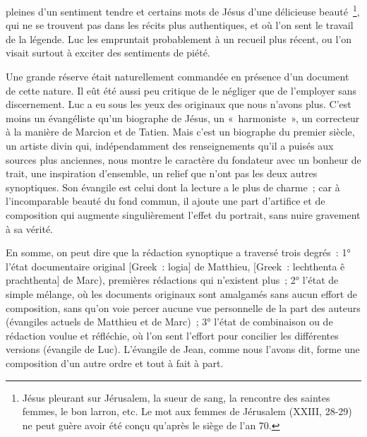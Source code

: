 \documentclass[french,twoside]{book} %
\begin{document}
pleines d’un sentiment tendre et certains mots de Jésus d’une délicieuse beauté \footnote{Jésus pleurant sur Jérusalem, la sueur de sang, la rencontre des saintes femmes, le bon larron, etc. Le mot aux femmes de Jérusalem (XXIII, 28-29) ne peut guère avoir été conçu qu’après le siège de l’an 70.}, qui ne se trouvent pas dans les récits plus authentiques, et où l’on sent le travail de la légende. Luc les empruntait probablement à un recueil plus récent, ou l’on visait surtout à exciter des sentiments de piété.\par
Une grande réserve était naturellement commandée en présence d’un document de cette nature. Il eût été aussi peu critique de le négliger que de l’employer sans discernement. Luc a eu sous les yeux des originaux que nous n’avons plus. C’est moins un évangéliste qu’un biographe de Jésus, un « harmoniste », un correcteur à la manière de Marcion et de Tatien. Mais c’est un biographe du premier siècle, un artiste divin qui, indépendamment des renseignements qu’il a puisés aux sources plus anciennes, nous montre le caractère du fondateur avec un bonheur de trait, une inspiration d’ensemble, un relief que n’ont pas les deux autres synoptiques. Son évangile est celui dont la lecture a le plus de charme ; car à l’incomparable beauté du fond commun, il ajoute une part d’artifice et de composition qui augmente singulièrement l’effet du portrait, sans nuire gravement à sa vérité.\par
En somme, on peut dire que la rédaction synoptique a traversé trois degrés : 1° l’état documentaire original [Greek : logia] de Matthieu, [Greek : lechthenta ê prachthenta] de Marc), premières rédactions qui n’existent plus ; 2° l’état de simple mélange, où les documents originaux sont amalgamés sans aucun effort de composition, sans qu’on voie percer aucune vue personnelle de la part des auteurs (évangiles actuels de Matthieu et de Marc) ; 3° l’état de combinaison ou de rédaction voulue et réfléchie, où l’on sent l’effort pour concilier les différentes versions (évangile de Luc). L’évangile de Jean, comme nous l’avons dit, forme une composition d’un autre ordre et tout à fait à part.\par
\end{document}
